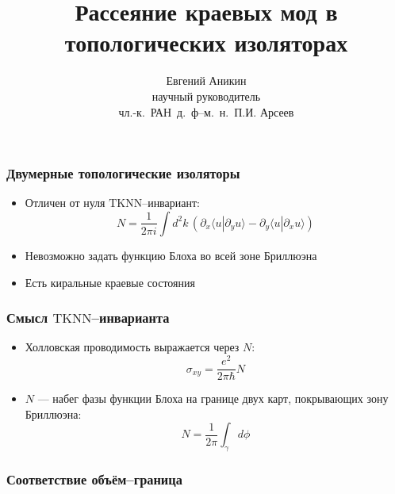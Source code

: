 \documentclass{beamer}
\title{Рассеяние краевых мод в топологических изоляторах}
\author[Е. Аникин]{Евгений Аникин \\
	научный руководитель\\
	чл.-к.~РАН~д.~ф--м.~н.~П.И. Арсеев}
\institute{ФИАН им. Лебедева}
\date{}
\begin{document}
\begin{frame}
    \titlepage
\end{frame}

\begin{frame}
    \frametitle{Двумерные топологические изоляторы}
    \begin{itemize}
        \item Отличен от нуля $\mathrm{TKNN}$--инвариант:
            \begin{equation}
                \label{TKNN}
                N = \frac{1}{2\pi i} 
                    \int d^2 k\, \left(\partial_x \langle u | \partial_y u \rangle -
                    \partial_y \langle u | \partial_x u \rangle \right)
            \end{equation}
        \item Невозможно задать функцию Блоха во всей зоне Бриллюэна
        \item Есть киральные краевые состояния
    \end{itemize}
\end{frame}

\begin{frame}
    \frametitle{Смысл $\mathrm{TKNN}$--инварианта}
    \begin{itemize}
        \item Холловская проводимость выражается через $N$:
            \begin{equation}
                \sigma_{xy} = \frac{e^2}{2\pi \hbar} N
            \end{equation}
        \item $N$ --- набег фазы функции Блоха на границе двух карт, покрывающих зону
            Бриллюэна:
            \begin{equation}
                N = \frac{1}{2\pi}\int_\gamma d\phi
            \end{equation}
    \end{itemize}
\end{frame}

\begin{frame}
    \frametitle{Соответствие объём--граница}
\end{frame}
\end{document}
